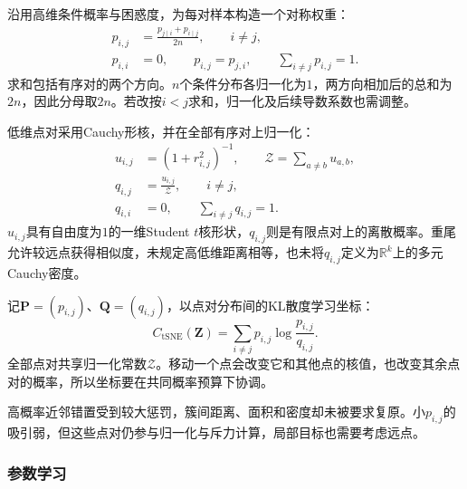 沿用高维条件概率与困惑度，为每对样本构造一个对称权重：
\begin{equation}
  \label{eq:dim-tsne-joint}
  \begin{aligned}
    p_{i,j}&=\frac{p_{j\mid i}+p_{i\mid j}}{2n},\qquad i\ne j,\\
    p_{i,i}&=0,\qquad p_{i,j}=p_{j,i},\qquad
      \sum_{i\ne j}p_{i,j}=1.
  \end{aligned}
\end{equation}
求和包括有序对的两个方向。$n$个条件分布各归一化为$1$，两方向相加后的总和为$2n$，因此分母取$2n$。若改按$i<j$求和，归一化及后续导数系数也需调整。

低维点对采用Cauchy形核，并在全部有序对上归一化：
\begin{equation}
  \label{eq:dim-tsne-low}
  \begin{aligned}
    u_{i,j}&=(1+r_{i,j}^2)^{-1},\qquad
      \mathcal{Z}=\sum_{a\ne b}u_{a,b},\\
    q_{i,j}&=\frac{u_{i,j}}{\mathcal{Z}},\qquad i\ne j,\\
    q_{i,i}&=0,\qquad \sum_{i\ne j}q_{i,j}=1.
  \end{aligned}
\end{equation}
$u_{i,j}$具有自由度为$1$的一维Student $t$核形状，$q_{i,j}$则是有限点对上的离散概率。重尾允许较远点获得相似度，未规定高低维距离相等，也未将$q_{i,j}$定义为$\mathbb{R}^k$上的多元Cauchy密度。

记$\bm{P}=(p_{i,j})$、$\bm{Q}=(q_{i,j})$，以点对分布间的KL散度学习坐标：
\begin{equation}
  \label{eq:dim-tsne-loss}
  C_{\mathrm{tSNE}}(\bm{Z})
    =\sum_{i\ne j}p_{i,j}\log\frac{p_{i,j}}{q_{i,j}}.
\end{equation}
全部点对共享归一化常数$\mathcal{Z}$。移动一个点会改变它和其他点的核值，也改变其余点对的概率，所以坐标要在共同概率预算下协调。

高概率近邻错置受到较大惩罚，簇间距离、面积和密度却未被要求复原。小$p_{i,j}$的吸引弱，但这些点对仍参与归一化与斥力计算，局部目标也需要考虑远点。

\subsubsection{参数学习}

